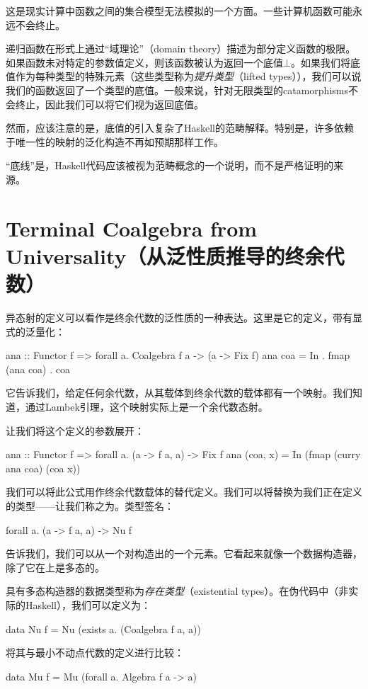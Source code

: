 \documentclass[DaoFP]{subfiles}
\begin{document}
    这是现实计算中函数之间的集合模型无法模拟的一个方面。一些计算机函数可能永远不会终止。

    递归函数在形式上通过“域理论”（domain theory）描述为部分定义函数的极限。如果函数未对特定的参数值定义，则该函数被认为返回一个底值$\bot$。如果我们将底值作为每种类型的特殊元素（这些类型称为\emph{提升类型}（lifted types）），我们可以说我们的函数返回了一个类型的底值。一般来说，针对无限类型的catamorphisms不会终止，因此我们可以将它们视为返回底值。

    然而，应该注意的是，底值的引入复杂了Haskell的范畴解释。特别是，许多依赖于唯一性的映射的泛化构造不再如预期那样工作。

    “底线”是，Haskell代码应该被视为范畴概念的一个说明，而不是严格证明的来源。

    \section{Terminal Coalgebra from Universality（从泛性质推导的终余代数）}

    异态射的定义可以看作是终余代数的泛性质的一种表达。这里是它的定义，带有显式的泛量化：
    \begin{haskell}
        ana :: Functor f => forall a. Coalgebra f a -> (a -> Fix f)
        ana coa = In . fmap (ana coa) . coa
    \end{haskell}
    它告诉我们，给定任何余代数，从其载体到终余代数的载体都有一个映射。我们知道，通过Lambek引理，这个映射实际上是一个余代数态射。

    让我们将这个定义的参数展开：
    \begin{haskell}
        ana :: Functor f => forall a. (a -> f a, a) -> Fix f
        ana (coa, x) = In (fmap (curry ana coa) (coa x))
    \end{haskell}
    我们可以将此公式用作终余代数载体的替代定义。我们可以将替换为我们正在定义的类型——让我们称之为。类型签名：
    \begin{haskell}
        forall a. (a -> f a, a) -> Nu f
    \end{haskell}
    告诉我们，我们可以从一个对构造出的一个元素。它看起来就像一个数据构造器，除了它在上是多态的。

    具有多态构造器的数据类型称为\emph{存在类型}（existential types）。在伪代码中（非实际的Haskell），我们可以定义为：
    \begin{haskell}
        data Nu f = Nu (exists a. (Coalgebra f a, a))
    \end{haskell}
    将其与最小不动点代数的定义进行比较：
    \begin{haskell}
        data Mu f = Mu (forall a. Algebra f a -> a)
    \end{haskell}
\end{document}
